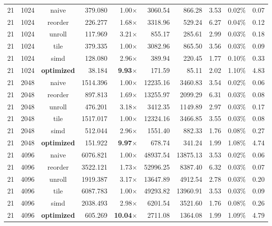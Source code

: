 \documentclass[11pt,a4paper]{article}
\begin{document}
{\begin{longtable}{rrcrrrrrrr}
\midrule
21 & 1024 & naive & 379.080 & 1.00$\times$ & 3060.54 & 866.28 & 3.53 & 0.02\% & 0.07 \\
21 & 1024 & reorder & 226.277 & 1.68$\times$ & 3318.96 & 529.24 & 6.27 & 0.04\% & 0.12 \\
21 & 1024 & unroll & 117.969 & 3.21$\times$ & 855.17 & 285.61 & 2.99 & 0.03\% & 0.18 \\
21 & 1024 & tile & 379.335 & 1.00$\times$ & 3082.96 & 865.50 & 3.56 & 0.03\% & 0.09 \\
21 & 1024 & simd & 128.080 & 2.96$\times$ & 389.94 & 220.45 & 1.77 & 0.10\% & 0.33 \\
21 & 1024 & \textbf{optimized} & 38.184 & \textbf{9.93$\times$} & 171.59 & 85.11 & 2.02 & 1.10\% & 4.83 \\
\midrule
21 & 2048 & naive & 1514.396 & 1.00$\times$ & 12235.16 & 3460.83 & 3.54 & 0.02\% & 0.06 \\
21 & 2048 & reorder & 897.813 & 1.69$\times$ & 13255.97 & 2099.29 & 6.31 & 0.03\% & 0.08 \\
21 & 2048 & unroll & 476.201 & 3.18$\times$ & 3412.35 & 1149.89 & 2.97 & 0.03\% & 0.17 \\
21 & 2048 & tile & 1517.017 & 1.00$\times$ & 12324.16 & 3466.85 & 3.55 & 0.03\% & 0.08 \\
21 & 2048 & simd & 512.044 & 2.96$\times$ & 1551.40 & 882.33 & 1.76 & 0.08\% & 0.27 \\
21 & 2048 & \textbf{optimized} & 151.922 & \textbf{9.97$\times$} & 678.74 & 341.24 & 1.99 & 1.08\% & 4.74 \\
\midrule
21 & 4096 & naive & 6076.821 & 1.00$\times$ & 48937.54 & 13875.13 & 3.53 & 0.02\% & 0.06 \\
21 & 4096 & reorder & 3522.121 & 1.73$\times$ & 52996.25 & 8387.40 & 6.32 & 0.03\% & 0.07 \\
21 & 4096 & unroll & 1919.387 & 3.17$\times$ & 13647.89 & 4912.54 & 2.78 & 0.03\% & 0.20 \\
21 & 4096 & tile & 6087.783 & 1.00$\times$ & 49293.82 & 13960.91 & 3.53 & 0.03\% & 0.09 \\
21 & 4096 & simd & 2038.493 & 2.98$\times$ & 6201.54 & 3521.60 & 1.76 & 0.08\% & 0.26 \\
21 & 4096 & \textbf{optimized} & 605.269 & \textbf{10.04$\times$} & 2711.08 & 1364.08 & 1.99 & 1.09\% & 4.79 \\
\end{longtable}
}
\clearpage
\end{document}
